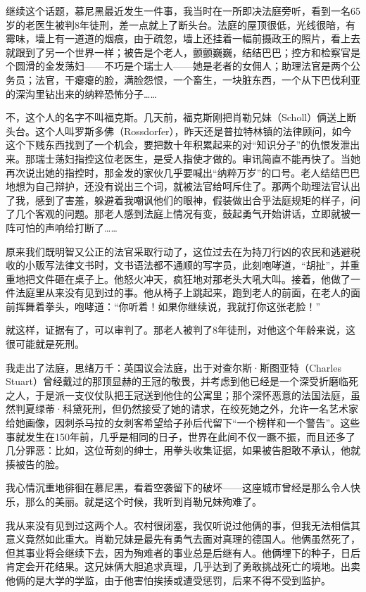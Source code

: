 \documentclass[UTF8]{ctexart}
\begin{document}
继续这个话题，慕尼黑最近发生一件事，我当时在一所即决法庭旁听，看到一名65岁的老医生被判8年徒刑，差一点就上了断头台。法庭的屋顶很低，光线很暗，有霉味，墙上有一道道的烟痕，由于疏忽，墙上还挂着一幅前摄政王的照片，看上去就跟到了另一个世界一样；被告是个老人，颤颤巍巍，结结巴巴；控方和检察官是个圆滑的金发荡妇——不巧是个瑞士人——她是老者的女佣人；助理法官是两个公务员；法官，干瘪瘪的脸，满脸怨恨，一个畜生，一块脏东西，一个从下巴伐利亚的深沟里钻出来的纳粹恐怖分子……

不，这个人的名字不叫福克斯。几天前，福克斯刚把肖勒兄妹（Scholl）俩送上断头台。这个人叫罗斯多佛（Rossdorfer），昨天还是普拉特林镇的法律顾问，如今这个下贱东西找到了一个机会，要把数十年积累起来的对“知识分子”的仇恨发泄出来。那瑞士荡妇指控这位老医生，是受人指使才做的。审讯简直不能再快了。当她再次说出她的指控时，那金发的家伙几乎要喊出“纳粹万岁”的口号。老人结结巴巴地想为自己辩护，还没有说出三个词，就被法官给呵斥住了。那两个助理法官认出了我，感到了害羞，躲避着我嘲讽他们的眼神，假装做出合乎法庭规矩的样子，问了几个客观的问题。那老人感到法庭上情况有变，鼓起勇气开始讲话，立即就被一阵可怕的声响给打断了……

原来我们既明智又公正的法官采取行动了，这位过去在为持刀行凶的农民和逃避税收的小贩写法律文书时，文书语法都不通顺的写字员，此刻咆哮道，“胡扯”，并重重地把文件砸在桌子上。他怒火冲天，疯狂地对那老头大吼大叫。接着，他做了一件法庭里从来没有见到过的事。他从椅子上跳起来，跑到老人的前面，在老人的面前挥舞着拳头，咆哮道：“你听着！如果你继续说，我就打你这张老脸！”

就这样，证据有了，可以审判了。那老人被判了8年徒刑，对他这个年龄来说，这很可能就是死刑。

我走出了法庭，思绪万千：英国议会法庭，出于对查尔斯·斯图亚特（Charles Stuart）曾经戴过的那顶显赫的王冠的敬畏，并考虑到他已经是一个深受折磨临死之人，于是派一支仪仗队把王冠送到他住的公寓里；那个深怀恶意的法国法庭，虽然判夏绿蒂·科黛死刑，但仍然接受了她的请求，在绞死她之外，允许一名艺术家给她画像，因刺杀马拉的女刺客希望给子孙后代留下“一个榜样和一个警告”。这些事就发生在150年前，几乎是相同的日子，世界在此间不仅一蹶不振，而且还多了几分罪恶：比如，这位苛刻的绅士，用拳头收集证据，如果被告胆敢不承认，他就揍被告的脸。

我心情沉重地徘徊在慕尼黑，看着空袭留下的破坏——这座城市曾经是那么令人快乐，那么的美丽。就是这个时候，我听到肖勒兄妹殉难了。

我从来没有见到过这两个人。农村很闭塞，我仅听说过他俩的事，但我无法相信其意义竟然如此重大。肖勒兄妹是最先有勇气去面对真理的德国人。他俩虽然死了，但其事业将会继续下去，因为殉难者的事业总是后继有人。他俩埋下的种子，日后肯定会开花结果。这兄妹俩大胆追求真理，几乎达到了勇敢挑战死亡的境地。出卖他俩的是大学的学监，由于他害怕挨揍或遭受惩罚，后来不得不受到监护。
\end{document}
